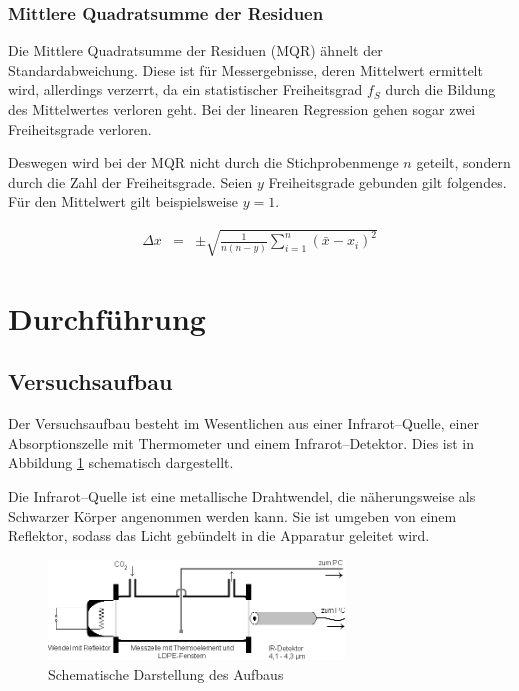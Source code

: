 \documentclass[12pt,a4paper]{scrartcl}
\numberwithin{equation}{section} %
\begin{document}
\hypertarget{mittlere-quadratsumme-der-residuen}{%
\subsubsection{Mittlere Quadratsumme der Residuen}\label{mittlere-quadratsumme-der-residuen}}

Die Mittlere Quadratsumme der Residuen (MQR) ähnelt der Standardabweichung. Diese ist für Messergebnisse, deren Mittelwert ermittelt wird, allerdings verzerrt, da ein statistischer Freiheitsgrad $f_S$ durch die Bildung des Mittelwertes verloren geht. Bei der linearen Regression gehen sogar zwei Freiheitsgrade verloren.

Deswegen wird bei der MQR nicht durch die Stichprobenmenge $n$ geteilt, sondern durch die Zahl der Freiheitsgrade. Seien $y$ Freiheitsgrade gebunden gilt folgendes. Für den Mittelwert gilt beispielsweise $y=1$.

\begin{eqnarray}
  \Delta x &=& \pm\sqrt{\frac{1}{n(n - y)}\sum_{i=1}^n(\bar{x}-x_i)^2}
\end{eqnarray}

\clearpage
\hypertarget{durchfuxfchrung}{%
\section{Durchführung}\label{durchfuxfchrung}}
\subsection{Versuchsaufbau}
\label{Versuchsaufbau}

Der Versuchsaufbau besteht im Wesentlichen aus einer Infrarot--Quelle, einer Absorptionszelle mit Thermometer und einem Infrarot--Detektor. Dies ist in Abbildung \ref{abb:Aufbau} schematisch dargestellt.

Die Infrarot--Quelle ist eine metallische Drahtwendel, die näherungsweise als Schwarzer Körper angenommen werden kann. Sie ist umgeben von einem Reflektor, sodass das Licht gebündelt in die Apparatur geleitet wird.

\begin{figure}[h!]
  \centering
  \includegraphics[width=0.7\textwidth]{../media/B1.1/IR_Aufbau.png}
  \caption{Schematische Darstellung des Aufbaus \cite{UzK}}
  \label{abb:Aufbau}
\end{figure}
\end{document}
